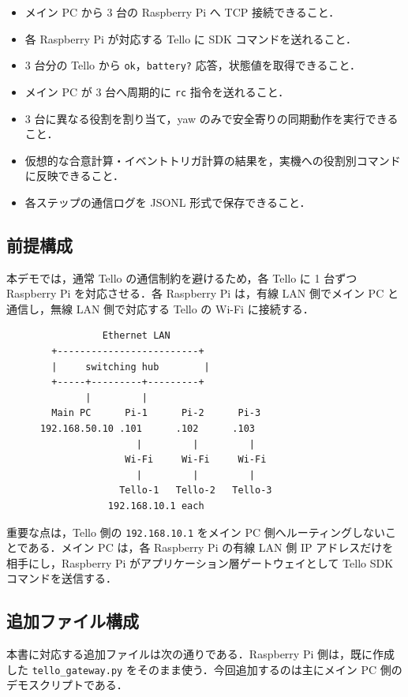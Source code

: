 \begin{itemize}
  \item メイン PC から 3 台の Raspberry Pi へ TCP 接続できること．
  \item 各 Raspberry Pi が対応する Tello に SDK コマンドを送れること．
  \item 3 台分の Tello から \texttt{ok}，\texttt{battery?} 応答，状態値を取得できること．
  \item メイン PC が 3 台へ周期的に \texttt{rc} 指令を送れること．
  \item 3 台に異なる役割を割り当て，yaw のみで安全寄りの同期動作を実行できること．
  \item 仮想的な合意計算・イベントトリガ計算の結果を，実機への役割別コマンドに反映できること．
  \item 各ステップの通信ログを JSONL 形式で保存できること．
\end{itemize}

\subsection{前提構成}

本デモでは，通常 Tello の通信制約を避けるため，各 Tello に 1 台ずつ Raspberry Pi を対応させる．各 Raspberry Pi は，有線 LAN 側でメイン PC と通信し，無線 LAN 側で対応する Tello の Wi-Fi に接続する．

\begin{lstlisting}
                 Ethernet LAN
        +-------------------------+
        |     switching hub        |
        +-----+---------+---------+
              |         |
        Main PC      Pi-1      Pi-2      Pi-3
      192.168.50.10 .101      .102      .103
                       |         |         |
                     Wi-Fi     Wi-Fi     Wi-Fi
                       |         |         |
                    Tello-1   Tello-2   Tello-3
                  192.168.10.1 each
\end{lstlisting}

重要な点は，Tello 側の \texttt{192.168.10.1} をメイン PC 側へルーティングしないことである．メイン PC は，各 Raspberry Pi の有線 LAN 側 IP アドレスだけを相手にし，Raspberry Pi がアプリケーション層ゲートウェイとして Tello SDK コマンドを送信する．

\subsection{追加ファイル構成}

本書に対応する追加ファイルは次の通りである．Raspberry Pi 側は，既に作成した \texttt{tello\_gateway.py} をそのまま使う．今回追加するのは主にメイン PC 側のデモスクリプトである．


